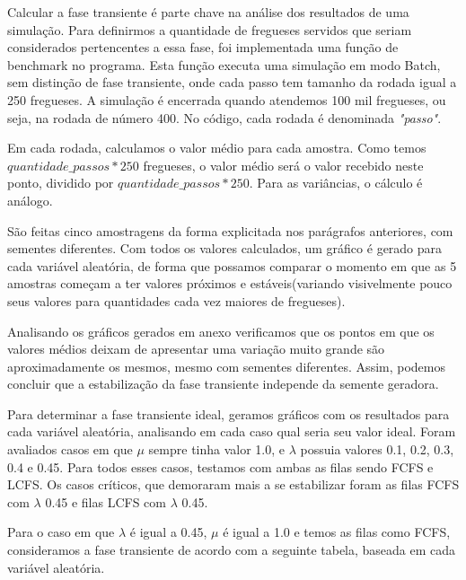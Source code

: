 \documentclass[a4paper,10pt]{article}
\begin{document}
    Calcular a fase transiente é parte chave na análise dos resultados de uma simulação. Para definirmos a quantidade de fregueses servidos que seriam considerados pertencentes a essa fase, foi implementada uma função de benchmark no programa. Esta função executa uma simulação em modo Batch, sem distinção de fase transiente, onde cada passo tem tamanho da rodada igual a 250 fregueses. A simulação é encerrada quando atendemos 100 mil fregueses, ou seja, na rodada de número 400. No código, cada rodada é denominada \emph{"passo"}.

    Em cada rodada, calculamos o valor médio para cada amostra. Como temos $quantidade\_passos * 250$ fregueses, o valor médio será o valor recebido neste ponto, dividido por $quantidade\_passos * 250$. Para as variâncias, o cálculo é análogo.

    São feitas cinco amostragens da forma explicitada nos parágrafos anteriores, com sementes diferentes. Com todos os valores calculados, um gráfico é gerado para cada variável aleatória, de forma que possamos comparar o momento em que as 5 amostras começam a ter valores próximos e estáveis(variando visivelmente pouco seus valores para quantidades cada vez maiores de fregueses).

    Analisando os gráficos gerados em anexo verificamos que os pontos em que os valores médios deixam de apresentar uma variação muito grande são aproximadamente os mesmos, mesmo com sementes diferentes. Assim, podemos concluir que a estabilização da fase transiente independe da semente geradora.

    Para determinar a fase transiente ideal, geramos gráficos com os resultados para cada variável aleatória, analisando em cada caso qual seria seu valor ideal. Foram avaliados casos em que $\mu$ sempre tinha valor 1.0, e $\lambda$ possuia valores 0.1, 0.2, 0.3, 0.4 e 0.45. Para todos esses casos, testamos com ambas as filas sendo FCFS e LCFS. Os casos críticos, que demoraram mais a se estabilizar foram as filas FCFS com $\lambda$ 0.45 e filas LCFS com $\lambda$ 0.45.

    Para o caso em que $\lambda$ é igual a 0.45, $\mu$ é igual a 1.0 e temos as filas como FCFS, consideramos a fase transiente de acordo com a seguinte tabela, baseada em cada variável aleatória.
\end{document}
